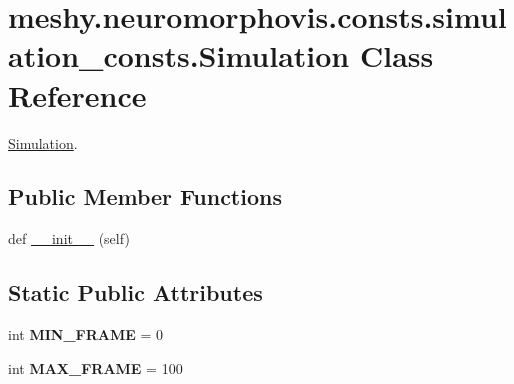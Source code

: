 \hypertarget{classmeshy_1_1neuromorphovis_1_1consts_1_1simulation__consts_1_1Simulation}{}\section{meshy.\+neuromorphovis.\+consts.\+simulation\+\_\+consts.\+Simulation Class Reference}
\label{classmeshy_1_1neuromorphovis_1_1consts_1_1simulation__consts_1_1Simulation}


\hyperlink{classmeshy_1_1neuromorphovis_1_1consts_1_1simulation__consts_1_1Simulation}{Simulation}.  


\subsection*{Public Member Functions}
\begin{DoxyCompactItemize}
\item 
def \hyperlink{classmeshy_1_1neuromorphovis_1_1consts_1_1simulation__consts_1_1Simulation_adb22ed13f36aeb30063f775af6d50585}{\+\_\+\+\_\+init\+\_\+\+\_\+} (self)\hypertarget{classmeshy_1_1neuromorphovis_1_1consts_1_1simulation__consts_1_1Simulation_adb22ed13f36aeb30063f775af6d50585}{}\label{classmeshy_1_1neuromorphovis_1_1consts_1_1simulation__consts_1_1Simulation_adb22ed13f36aeb30063f775af6d50585}

\end{DoxyCompactItemize}
\subsection*{Static Public Attributes}
\begin{DoxyCompactItemize}
\item 
int {\bfseries M\+I\+N\+\_\+\+F\+R\+A\+ME} = 0\hypertarget{classmeshy_1_1neuromorphovis_1_1consts_1_1simulation__consts_1_1Simulation_ae78a7221dc5c49d933474ff68fb4e4eb}{}\label{classmeshy_1_1neuromorphovis_1_1consts_1_1simulation__consts_1_1Simulation_ae78a7221dc5c49d933474ff68fb4e4eb}

\item 
int {\bfseries M\+A\+X\+\_\+\+F\+R\+A\+ME} = 100\hypertarget{classmeshy_1_1neuromorphovis_1_1consts_1_1simulation__consts_1_1Simulation_afac66b5bd185d7680906a3723bb97b01}{}\label{classmeshy_1_1neuromorphovis_1_1consts_1_1simulation__consts_1_1Simulation_afac66b5bd185d7680906a3723bb97b01}

\end{DoxyCompactItemize}


